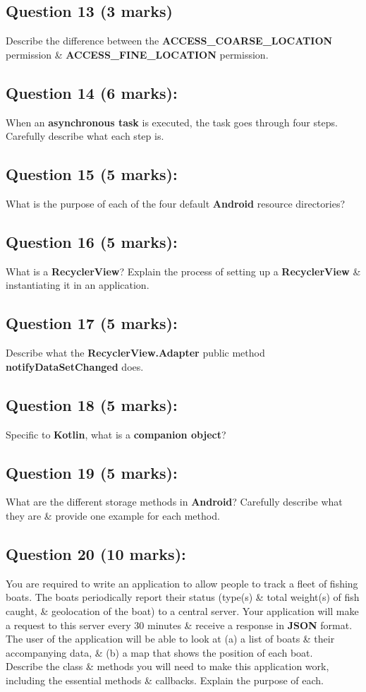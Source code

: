 \documentclass{article}
\begin{document}
\subsection*{Question 13 (3 marks)}
Describe the difference between the \textbf{ACCESS\_COARSE\_LOCATION} permission \& \textbf{ACCESS\_FINE\_LOCATION} permission.

\subsection*{Question 14 (6 marks):}
When an \textbf{asynchronous task} is executed, the task goes through four steps. Carefully describe what each step is.

\subsection*{Question 15 (5 marks):}
What is the purpose of each of the four default \textbf{Android} resource directories?

\subsection*{Question 16 (5 marks):}
What is a \textbf{RecyclerView}? Explain the process of setting up a \textbf{RecyclerView} \& instantiating it in an application.

\subsection*{Question 17 (5 marks):}
Describe what the \textbf{RecyclerView.Adapter} public method \textbf{notifyDataSetChanged} does.

\subsection*{Question 18 (5 marks):}
Specific to \textbf{Kotlin}, what is a \textbf{companion object}?

\subsection*{Question 19 (5 marks):}
What are the different storage methods in \textbf{Android}? Carefully describe what they are \& provide one example for each method.

\subsection*{Question 20 (10 marks):}
You are required to write an application to allow people to track a fleet of fishing boats. The boats periodically report their status (type(s) \& total weight(s) of fish caught, \& geolocation of the boat) to a central server. Your application will make a request to this server every 30 minutes \& receive a response in \textbf{JSON} format. The user of the application will be able to look at (a) a list of boats \& their accompanying data, \& (b) a map that shows the position of each boat. \\

Describe the class \& methods you will need to make this application work, including the essential methods \& callbacks. Explain the purpose of each.
\end{document}
